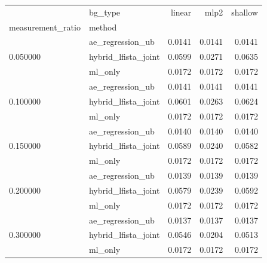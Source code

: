 \begin{tabular}{llrrr}
\toprule
 & bg_type & linear & mlp2 & shallow \\
measurement_ratio & method &  &  &  \\
\midrule
\multirow[t]{3}{*}{0.050000} & ae_regression_ub & 0.0141 & 0.0141 & 0.0141 \\
 & hybrid_lfista_joint & 0.0599 & 0.0271 & 0.0635 \\
 & ml_only & 0.0172 & 0.0172 & 0.0172 \\
\cline{1-5}
\multirow[t]{3}{*}{0.100000} & ae_regression_ub & 0.0141 & 0.0141 & 0.0141 \\
 & hybrid_lfista_joint & 0.0601 & 0.0263 & 0.0624 \\
 & ml_only & 0.0172 & 0.0172 & 0.0172 \\
\cline{1-5}
\multirow[t]{3}{*}{0.150000} & ae_regression_ub & 0.0140 & 0.0140 & 0.0140 \\
 & hybrid_lfista_joint & 0.0589 & 0.0240 & 0.0582 \\
 & ml_only & 0.0172 & 0.0172 & 0.0172 \\
\cline{1-5}
\multirow[t]{3}{*}{0.200000} & ae_regression_ub & 0.0139 & 0.0139 & 0.0139 \\
 & hybrid_lfista_joint & 0.0579 & 0.0239 & 0.0592 \\
 & ml_only & 0.0172 & 0.0172 & 0.0172 \\
\cline{1-5}
\multirow[t]{3}{*}{0.300000} & ae_regression_ub & 0.0137 & 0.0137 & 0.0137 \\
 & hybrid_lfista_joint & 0.0546 & 0.0204 & 0.0513 \\
 & ml_only & 0.0172 & 0.0172 & 0.0172 \\
\cline{1-5}
\bottomrule
\end{tabular}
